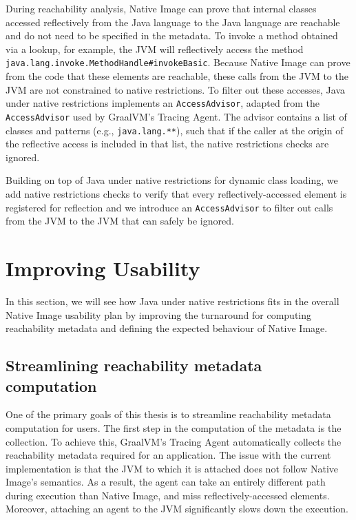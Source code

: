During reachability analysis, Native Image can prove that internal classes accessed reflectively from the Java language to the Java language are reachable and do not need to be specified in the metadata. 
To invoke a method obtained via a lookup, for example, the JVM will reflectively access the method \verb|java.lang.invoke.MethodHandle#invokeBasic|. Because Native Image can prove from the code that these elements are reachable, these calls from the JVM to the JVM are not constrained to native restrictions. To filter out these accesses, Java under native restrictions implements an \verb|AccessAdvisor|, adapted from the \verb|AccessAdvisor| used by GraalVM's Tracing Agent. The advisor contains a list of classes and patterns (e.g., \verb|java.lang.**|), such that if the caller at the origin of the reflective access is included in that list, the native restrictions checks are ignored.

Building on top of Java under native restrictions for dynamic class loading, we add native restrictions checks to verify that every reflectively-accessed element is registered for reflection and we introduce an \verb|AccessAdvisor| to filter out calls from the JVM to the JVM that can safely be ignored.

\section{Improving Usability}
In this section, we will see how Java under native restrictions fits in the overall Native Image usability plan by improving the turnaround for computing reachability metadata and defining the expected behaviour of Native Image. 

\subsection{Streamlining reachability metadata computation}
One of the primary goals of this thesis is to streamline reachability metadata computation for users.
The first step in the computation of the metadata is the collection. To achieve this, GraalVM's Tracing Agent automatically collects the reachability metadata required for an application. The issue with the current implementation is that the JVM to which it is attached does not follow Native Image's semantics. As a result, the agent can take an entirely different path during execution than Native Image, and miss reflectively-accessed elements. Moreover, attaching an agent to the JVM significantly slows down the execution.

